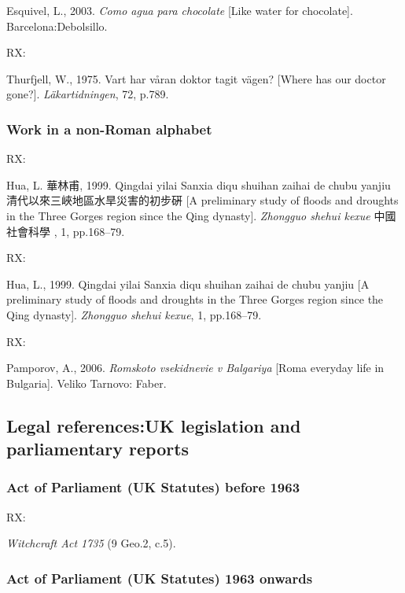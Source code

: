 Esquivel, L., 2003. \emph{Como agua para chocolate} [Like water for chocolate]. Barcelona:\@ Debolsillo.



RX: \cite{thurfjell1975vhv}

Thurfjell, W., 1975. Vart har våran doktor tagit vägen? [Where has our doctor gone?]. \emph{Läkartidningen}, 72, p.789.



\subsubsection*{Work in a non-Roman alphabet}

RX: \cite{hua1999qys1}

Hua, L. 華林甫, 1999.  Qingdai yilai Sanxia diqu shuihan zaihai de chubu yanjiu 清代以來三峽地區水旱災害的初步硏 [A preliminary study of floods and droughts in the Three Gorges region since the Qing dynasty]. \emph{Zhongguo shehui kexue} 中國社會科學 , 1, pp.168--79.


RX: \cite{hua1999qys2}

Hua, L., 1999. Qingdai yilai Sanxia diqu shuihan zaihai de chubu yanjiu [A preliminary study of floods and droughts in the Three Gorges region since the Qing dynasty]. \emph{Zhongguo shehui kexue}, 1, pp.168--79.


RX: \cite{pamporov2006rvb}

Pamporov, A., 2006. \emph{Romskoto vsekidnevie v Balgariya} [Roma everyday life in Bulgaria]. Veliko Tarnovo: Faber.



\subsection{Legal references:\@ UK legislation and parliamentary reports}


\subsubsection*{Act of Parliament (UK Statutes) before 1963}

RX: \cite{gb.wa1735}

\emph{Witchcraft Act 1735} (9 Geo.2, c.5).



\subsubsection*{Act of Parliament (UK Statutes) 1963 onwards}

